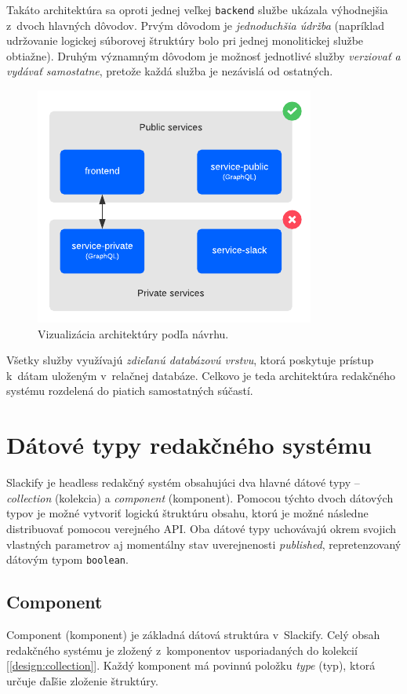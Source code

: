 \noindent Takáto architektúra sa oproti jednej veľkej \texttt{backend} službe ukázala výhodnejšia z~dvoch hlavných dôvodov. Prvým dôvodom je \emph{jednoduchšia údržba} (napríklad udržovanie logickej súborovej štruktúry bolo pri jednej monolitickej službe obtiažne). Druhým významným dôvodom je možnosť jednotlivé služby \emph{verziovať a vydávať samostatne}, pretože každá služba je nezávislá od ostatných.

\begin{figure}[h]
	\centering
	\includegraphics[scale=1.2]{obrazky-figures/architecture}
	\caption{Vizualizácia architektúry podľa návrhu.}
\end{figure}

\noindent Všetky služby využívajú \emph{zdieľanú databázovú vrstvu}, ktorá poskytuje prístup k~dátam uloženým v~relačnej databáze. Celkovo je teda architektúra redakčného systému rozdelená do piatich samostatných súčastí.

\section{Dátové typy redakčného systému}
\label{theory:data_types}
Slackify je headless redakčný systém obsahujúci dva hlavné dátové typy -- \emph{collection} (kolekcia) a \emph{component} (komponent). Pomocou týchto dvoch dátových typov je možné vytvoriť logickú štruktúru obsahu, ktorú je možné následne distribuovať pomocou verejného API. Oba dátové typy uchovávajú okrem svojich vlastných parametrov aj momentálny stav uverejnenosti \emph{published}, repretenzovaný dátovým typom \texttt{boolean}.

\subsection{Component}
Component (komponent) je základná dátová struktúra v~Slackify. Celý obsah redakčného systému je zložený z~komponentov usporiadaných do kolekcií [\ref{design:collection}]. Každý komponent má povinnú položku \emph{type} (typ), ktorá určuje ďaľšie zloženie štruktúry.

